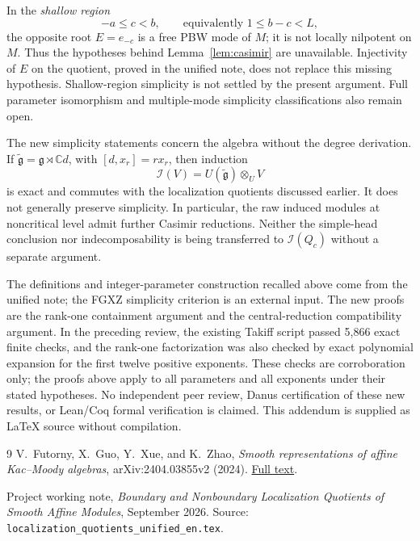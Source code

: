 \documentclass[11pt,a4paper]{article}
\newcommand{\C}{\mathbb C}
\newcommand{\g}{\mathfrak g}
\newcommand{\I}{\mathcal I}
\theoremstyle{plainupright}
\begin{document}
In the \emph{shallow region}
\[
-a\le c<b,\qquad\text{equivalently }1\le b-c<L,
\]
the opposite root \(E=e_{-c}\) is a free PBW mode of \(M\);
it is not locally nilpotent on \(M\).
Thus the hypotheses behind Lemma~\ref{lem:casimir} are unavailable.
Injectivity of \(E\) on the quotient, proved in the unified note,
does not replace this missing hypothesis.
Shallow-region simplicity is not settled by the present argument.
Full parameter isomorphism and multiple-mode simplicity classifications
also remain open.

The new simplicity statements concern the algebra without the degree
derivation. If
\(\widetilde{\g}=\g\rtimes\C d\), with \([d,x_r]=rx_r\), then induction
\[
\I(V)=U(\widetilde{\g})\otimes_U V
\]
is exact and commutes with the localization quotients discussed earlier.
It does not generally preserve simplicity. In particular, the raw
induced modules at noncritical level admit further Casimir reductions.
Neither the simple-head conclusion nor indecomposability is being
transferred to \(\I(Q_c)\) without a separate argument.

The definitions and integer-parameter construction recalled above come
from the unified note; the FGXZ simplicity criterion is an external
input. The new proofs are the rank-one containment argument and the
central-reduction compatibility argument.
In the preceding review, the existing Takiff script passed 5,866 exact
finite checks, and the rank-one factorization was also checked by
exact polynomial expansion for the first twelve positive exponents.
These checks are corroboration only; the proofs above apply to all
parameters and all exponents under their stated hypotheses.
No independent peer review, Danus certification of these new results,
or Lean/Coq formal verification is claimed.
This addendum is supplied as LaTeX source without compilation.

\begingroup
\raggedright
\begin{thebibliography}{9}
V.~Futorny, X.~Guo, Y.~Xue, and K.~Zhao,
\emph{Smooth representations of affine Kac--Moody algebras},
arXiv:2404.03855v2 (2024).
\href{https://arxiv.org/html/2404.03855v2}{Full text}.

Project working note,
\emph{Boundary and Nonboundary Localization Quotients of Smooth
Affine Modules}, September 2026.
Source: \texttt{localization\_quotients\_unified\_en.tex}.
\end{thebibliography}
\endgroup
\end{document}
